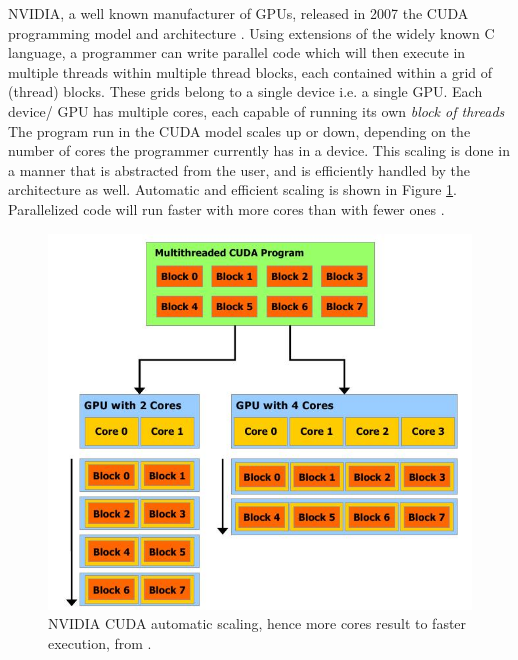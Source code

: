 \documentclass{svmultm}
\begin{document}
NVIDIA, a well known manufacturer of GPUs, released in
2007 the CUDA programming model and architecture \cite{cudapage}.
Using extensions of the widely known C language, a
programmer can write parallel code which will then execute
in multiple threads within multiple thread blocks, each
contained within a grid of (thread) blocks. These grids
belong to a single device i.e. a single  {GPU}. Each
device/ {GPU} has multiple cores, each capable of running
its own \textit{block of threads}
The program run in the CUDA model scales
up or down, depending on the number of cores the
programmer currently has in a device. This scaling is done
in a manner that is abstracted from the user, and is
efficiently handled by the architecture as well. Automatic and efficient scaling is shown
in Figure \ref{cuda_scale}. Parallelized code will run faster with more cores
than with fewer ones \cite{cudaguide}.

	\begin{figure}
		\centering
		\includegraphics[scale=.5]{figures/cuda-scaling.jpeg} 
		\caption{NVIDIA CUDA automatic scaling, hence more cores
result to faster execution, from \cite{cudaguide}.}
		\label{cuda_scale}
	\end{figure}
	
\end{document}
